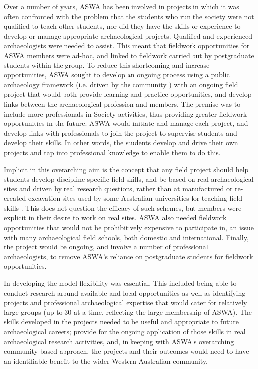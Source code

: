 \documentclass{ijsra}
\begin{document}
Over a number of years, ASWA has been involved in projects in which it was often confronted with the problem that the students who run the society were not qualified to teach other students, nor did they have the skills or experience to develop or manage appropriate archaeological projects. 
Qualified and experienced archaeologists were needed to assist. This meant that fieldwork opportunities for ASWA members were ad-hoc, and linked to fieldwork carried out by postgraduate students within the group. 
To reduce this shortcoming and increase opportunities, ASWA sought to develop an ongoing process using a public archaeology framework (i.e. driven by the community \parencite {faulkner2000}) with an ongoing field project that would both provide learning and practice opportunities, and develop links between the archaeological profession and members. 
The premise was to include more professionals in Society activities, thus providing greater fieldwork opportunities in the future. 
ASWA would initiate and manage each project, and develop links with professionals to join the project to supervise students and develop their skills. 
In other words, the students develop and drive their own projects and tap into professional knowledge to enable them to do this.

Implicit in this overarching aim is the concept that any field project should help students develop discipline specific field skills, and be based on real archaeological sites and driven by real research questions, rather than at manufactured or re-created excavation sites used by some Australian universities for teaching field skills \parencites[e.g.]{cosgrove2013}{hall2005}. 
This does not question the efficacy of such schemes, but members were explicit in their desire to work on real sites. 
ASWA also needed fieldwork opportunities that would not be prohibitively expensive to participate in, an issue with many archaeological field schools, both domestic and international. 
Finally, the project would be ongoing, and involve a number of professional archaeologists, to remove ASWA’s reliance on postgraduate students for fieldwork opportunities.

In developing the model flexibility was essential. This included being able to conduct research around available and local opportunities as well as identifying projects and professional archaeological expertise that would cater for relatively large groups (up to 30 at a time, reflecting the large membership of ASWA). 
The skills developed in the projects needed to be useful and appropriate to future archaeological careers; provide for the ongoing application of those skills in real archaeological research activities, and, in keeping with ASWA’s overarching community based approach, the projects and their outcomes would need to have an identifiable benefit to the wider Western Australian community.
\end{document}
